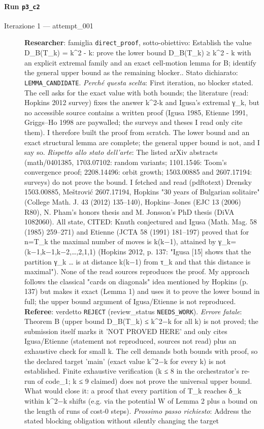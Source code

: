 \documentclass[11pt,a4paper]{article}
\begin{document}
\paragraph{Run \texttt{p3\_c2}}
\begin{description}
\item[Iterazione 1 — attempt\_001]
\textbf{Researcher}: famiglia \texttt{direct\_proof}, sotto-obiettivo: Establish the value D\_B(T\_k) = k\textasciicircum{}2 - k: prove the lower bound D\_B(T\_k) ≥ k\textasciicircum{}2 - k with an explicit extremal family and an exact cell-motion lemma for B; identify the general upper bound as the remaining blocker.. Stato dichiarato: \texttt{LEMMA\_CANDIDATE}.
\emph{Perché questa scelta}: First iteration, no blocker stated. The cell asks for the exact value with both bounds; the literature (read: Hopkins 2012 survey) fixes the answer k\textasciicircum{}2-k and Igusa's extremal γ\_k, but no accessible source contains a written proof (Igusa 1985, Etienne 1991, Griggs–Ho 1998 are paywalled; the surveys and theses I read only cite them). I therefore built the proof from scratch. The lower bound and an exact structural lemma are complete; the general upper bound is not, and I say so.
\emph{Rispetto allo stato dell'arte}: The listed arXiv abstracts (math/0401385, 1703.07102: random variants; 1101.1546: Toom's convergence proof; 2208.14496: orbit growth; 1503.00885 and 2607.17194: surveys) do not prove the bound. I fetched and read (pdftotext) Drensky 1503.00885, Meštrović 2607.17194, Hopkins "30 years of Bulgarian solitaire" (College Math. J. 43 (2012) 135–140), Hopkins–Jones (EJC 13 (2006) R80), N. Pham's honors thesis and M. Jonsson's PhD thesis (DiVA 1082060). All state, CITED: Knuth conjectured and Igusa (Math. Mag. 58 (1985) 259–271) and Etienne (JCTA 58 (1991) 181–197) proved that for n=T\_k the maximal number of moves is k(k−1), attained by γ\_k=(k−1,k−1,k−2,…,2,1,1) (Hopkins 2012, p. 137: "Igusa [15] shows that the partition γ\_k … is at distance k(k−1) from τ\_k and that this distance is maximal"). None of the read sources reproduces the proof. My approach follows the classical "cards on diagonals" idea mentioned by Hopkins (p. 137) but makes it exact (Lemma 1) and uses it to prove the lower bound in full; the upper bound argument of Igusa/Etienne is not reproduced.
\textbf{Referee}: verdetto \texttt{REJECT} (review\_status \texttt{NEEDS\_WORK}).
\emph{Errore fatale}: Theorem B (upper bound D\_B(T\_k) ≤ k\textasciicircum{}2−k for all k) is not proved; the submission itself marks it 'NOT PROVED HERE' and only cites Igusa/Etienne (statement not reproduced, sources not read) plus an exhaustive check for small k. The cell demands both bounds with proof, so the declared target 'main' (exact value k\textasciicircum{}2−k for every k) is not established. Finite exhaustive verification (k ≤ 8 in the orchestrator's re-run of code\_1; k ≤ 9 claimed) does not prove the universal upper bound. What would close it: a proof that every partition of T\_k reaches δ\_k within k\textasciicircum{}2−k shifts (e.g. via the potential W of Lemma 2 plus a bound on the length of runs of cost‑0 steps).
\emph{Prossimo passo richiesto}: Address the stated blocking obligation without silently changing the target
\end{description}
\end{document}
